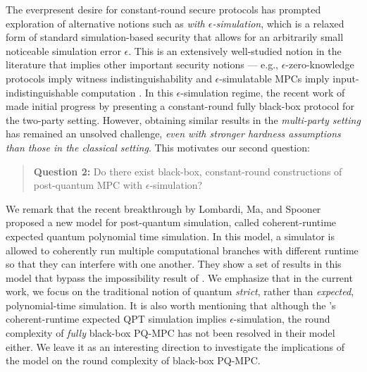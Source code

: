 The everpresent desire for constant-round secure protocols has prompted exploration of alternative notions such as {\em with $\epsilon$-simulation}, which is a relaxed form of standard simulation-based security that allows for an arbitrarily small noticeable simulation error $\epsilon$. This is an extensively well-studied notion in the literature \cite{DBLP:conf/focs/DworkNRS99,C:JKKR17,STOC:BitKhuPan19} that implies other important security notions --- e.g., $\epsilon$-zero-knowledge protocols imply witness indistinguishability \cite{STOC:FeiSha90} and $\epsilon$-simulatable MPCs imply input-indistinguishable computation \cite{FOCS:MicPasRos06}. 
In this $\epsilon$-simulation regime, the recent work of \cite{C:CCLY22} made initial progress by presenting a constant-round fully black-box protocol for the two-party setting. However, obtaining similar results in the {\em multi-party setting} has remained an unsolved challenge, {\em even with stronger hardness assumptions than those in the classical setting}. This motivates our second question:
\begin{quote}
 {\bf Question 2:} Do there exist black-box, constant-round constructions of post-quantum MPC with $\epsilon$-simulation?
 \end{quote} 


We remark that the recent breakthrough by Lombardi, Ma, and Spooner \cite{lombardi2022post} proposed a new model for post-quantum simulation, called coherent-runtime expected quantum polynomial time simulation. In this model, a simulator is allowed to coherently run multiple computational branches with different runtime so that they can interfere with one another.   
They show a set of results in this model that bypass the impossibility result of \cite{chia2022impossibility}. 
We emphasize that in the current work, we focus on the traditional notion of quantum \emph{strict}, rather than \emph{expected}, polynomial-time simulation. It is also worth mentioning that although the \cite{lombardi2022post}'s coherent-runtime expected QPT simulation implies $\epsilon$-simulation, the round complexity of {\em fully} black-box PQ-MPC has not been resolved in their model either. We leave it as an interesting direction to investigate the implications of the \cite{lombardi2022post} model on the round complexity of black-box PQ-MPC.


